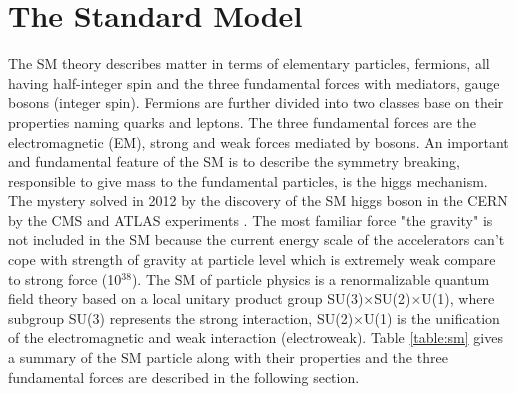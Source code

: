 \section{The Standard Model}\label{sec:sm}
The SM theory describes matter in terms of elementary particles, fermions, all having half-integer spin and the three fundamental forces with mediators, gauge bosons (integer spin). Fermions are further divided into two classes base on their properties naming quarks and leptons. The three fundamental forces are the electromagnetic (EM), strong and weak forces mediated by bosons. An important and fundamental feature of the SM is to describe the symmetry breaking, responsible to give mass to the fundamental particles, is the higgs mechanism. The mystery solved in 2012 by the discovery of the SM higgs boson in the CERN by the CMS and ATLAS experiments \cite{cms_sm_higgs,atlas_sm_higgs}. The most familiar force "the gravity" is not included in the SM because the current energy scale of the accelerators can't cope with strength of gravity at particle level which is extremely weak compare to strong force (10$^{38}$). The SM of particle physics is a renormalizable quantum field theory based on a local unitary product group SU(3)$\times$SU(2)$\times$U(1), where subgroup SU(3) represents the strong interaction, SU(2)$\times$U(1) is the unification of the electromagnetic and weak interaction (electroweak). Table \ref{table:sm} gives a summary of the SM particle along with their properties and the three fundamental forces are described in the following section. 
